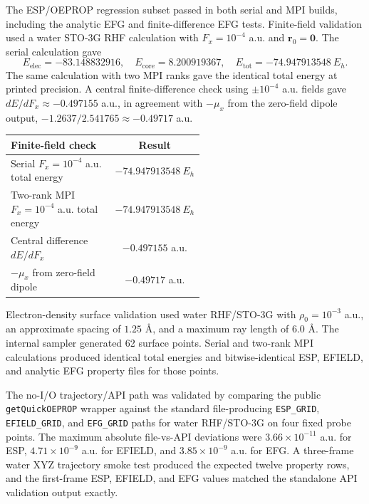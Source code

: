 \documentclass[journal=jcisd8,manuscript=article]{achemso}
\newcommand{\quickkeyword}[1]{\texttt{#1}}
\begin{document}
The ESP/OEPROP regression subset passed in both serial and MPI builds, including the analytic EFG and finite-difference EFG tests.  Finite-field validation used a water STO-3G RHF calculation with \(F_x=10^{-4}\) a.u. and \(\mathbf{r}_0=\mathbf{0}\).  The serial calculation gave
\[
  E_{\mathrm{elec}}=-83.148832916,\quad
  E_{\mathrm{core}}=8.200919367,\quad
  E_{\mathrm{tot}}=-74.947913548~E_h.
\]
The same calculation with two MPI ranks gave the identical total energy at printed precision.  A central finite-difference check using \(\pm 10^{-4}\) a.u. fields gave \(dE/dF_x\approx -0.497155\) a.u., in agreement with \(-\mu_x\) from the zero-field dipole output, \( -1.2637/2.541765 \approx -0.49717\) a.u.

\begin{center}
\small
\begin{tabular}{p{0.54\linewidth}c}
\toprule
Finite-field check & Result \\
\midrule
Serial \(F_x=10^{-4}\) a.u. total energy & \(-74.947913548~E_h\) \\
Two-rank MPI \(F_x=10^{-4}\) a.u. total energy & \(-74.947913548~E_h\) \\
Central difference \(dE/dF_x\) & \(-0.497155\) a.u. \\
\(-\mu_x\) from zero-field dipole & \(-0.49717\) a.u. \\
\bottomrule
\end{tabular}
\end{center}

Electron-density surface validation used water RHF/STO-3G with \(\rho_0=10^{-3}\) a.u., an approximate spacing of \(1.25\) \AA, and a maximum ray length of \(6.0\) \AA.  The internal sampler generated 62 surface points.  Serial and two-rank MPI calculations produced identical total energies and bitwise-identical ESP, EFIELD, and analytic EFG property files for those points.

The no-I/O trajectory/API path was validated by comparing the public \texttt{getQuickOEPROP} wrapper against the standard file-producing \quickkeyword{ESP\_GRID}, \quickkeyword{EFIELD\_GRID}, and \quickkeyword{EFG\_GRID} paths for water RHF/STO-3G on four fixed probe points.  The maximum absolute file-vs-API deviations were \(3.66\times10^{-11}\) a.u. for ESP, \(4.71\times10^{-9}\) a.u. for EFIELD, and \(3.85\times10^{-9}\) a.u. for EFG.  A three-frame water XYZ trajectory smoke test produced the expected twelve property rows, and the first-frame ESP, EFIELD, and EFG values matched the standalone API validation output exactly.
\end{document}
